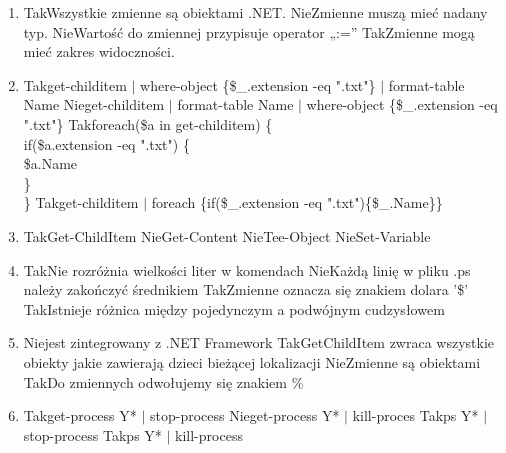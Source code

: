 \begin{enumerate}
		\newpage
		\item {}%
		{Tak}{Wszystkie zmienne są obiektami .NET.}%
		{Nie}{Zmienne muszą mieć nadany typ.}%
		{Nie}{Wartość do zmiennej przypisuje operator „:=”}%
		{Tak}{Zmienne mogą mieć zakres widoczności.}
		\item {}%
		{Tak}{get-childitem $ \mid $ where-object \{\$\_.extension -eq ".txt"\} $ \mid $ format-table Name}%
		{Nie}{get-childitem $ \mid $ format-table Name $ \mid $ where-object \{\$\_.extension -eq ".txt"\}}%
		{Tak}{foreach(\$a in get-childitem) \{\\
				if(\$a.extension -eq ".txt") \{\\
					\$a.Name\\
				\}\\
			\}}%
		{Tak}{get-childitem $ \mid $ foreach \{if(\$\_.extension -eq ".txt")\{\$\_.Name\}\}}
		\item {}%
		{Tak}{Get-ChildItem}%
		{Nie}{Get-Content}%
		{Nie}{Tee-Object}%
		{Nie}{Set-Variable}
		\item {}%
		{Tak}{Nie rozróżnia wielkości liter w komendach}%
		{Nie}{Każdą linię w pliku .ps należy zakończyć średnikiem}%
		{Tak}{Zmienne oznacza się znakiem dolara '\$'}%
		{Tak}{Istnieje różnica między pojedynczym a podwójnym cudzysłowem}
		\item {}%
		{Nie}{jest zintegrowany z .NET Framework}%
		{Tak}{GetChildItem zwraca wszystkie obiekty jakie zawierają dzieci bieżącej lokalizacji}%
		{Nie}{Zmienne są obiektami}%
		{Tak}{Do zmiennych odwołujemy się znakiem \%}
		\item {}%
		{Tak}{get-process Y* $ \mid $ stop-process}%
		{Nie}{get-process Y* $ \mid $ kill-proces}%
		{Tak}{ps Y* $ \mid $ stop-process}%
		{Tak}{ps Y* $ \mid $ kill-process}
		

\end{enumerate}
